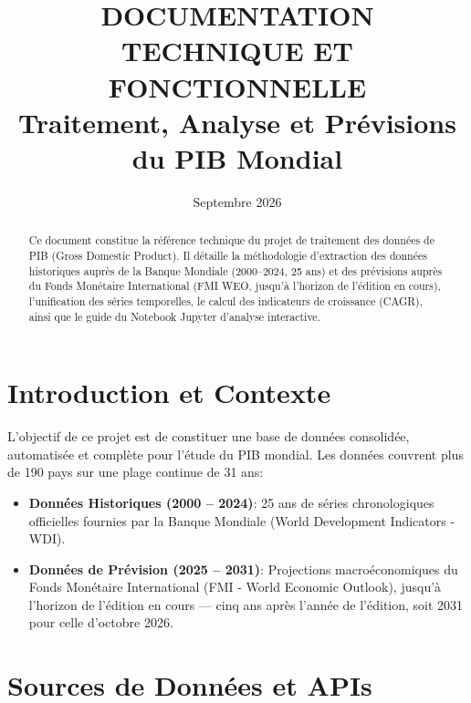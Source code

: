 \documentclass[11pt,a4paper]{article}
\title{\textbf{DOCUMENTATION TECHNIQUE ET FONCTIONNELLE}\\[0.5em]
\Large Traitement, Analyse et Prévisions du PIB Mondial}
\author{}
\date{Septembre 2026}
\begin{document}
\maketitle

\begin{abstract}
Ce document constitue la référence technique du projet de traitement des données de PIB (Gross Domestic Product). Il détaille la méthodologie d'extraction des données historiques auprès de la Banque Mondiale (2000--2024, 25 ans) et des prévisions auprès du Fonds Monétaire International (FMI WEO, jusqu'à l'horizon de l'édition en cours), l'unification des séries temporelles, le calcul des indicateurs de croissance (CAGR), ainsi que le guide du Notebook Jupyter d'analyse interactive.
\end{abstract}

\tableofcontents
\newpage

\section{Introduction et Contexte}
L'objectif de ce projet est de constituer une base de données consolidée, automatisée et complète pour l'étude du PIB mondial. Les données couvrent plus de 190 pays sur une plage continue de 31 ans:
\begin{itemize}
    \item \textbf{Données Historiques (2000 -- 2024)}: 25 ans de séries chronologiques officielles fournies par la Banque Mondiale (World Development Indicators - WDI).
    \item \textbf{Données de Prévision (2025 -- 2031)}: Projections macroéconomiques du Fonds Monétaire International (FMI - World Economic Outlook), jusqu'à l'horizon de l'édition en cours --- cinq ans après l'année de l'édition, soit 2031 pour celle d'octobre 2026.
\end{itemize}

\section{Sources de Données et APIs}
\end{document}
